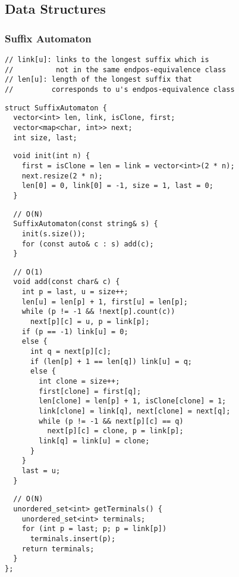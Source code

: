 \documentclass[twoside]{article}
\begin{document}
\begin{multicols*}{2}
\subsection*{Data Structures}
\vspace{2em}
\subsubsectionfont{\large\bfseries\sffamily\underline}
\subsubsection*{Suffix Automaton}
\begin{verbatim}
// link[u]: links to the longest suffix which is
//          not in the same endpos-equivalence class
// len[u]: length of the longest suffix that
//         corresponds to u's endpos-equivalence class
\end{verbatim}
\vspace{-12pt}
\begin{verbatim}
struct SuffixAutomaton {
  vector<int> len, link, isClone, first;
  vector<map<char, int>> next;
  int size, last;
\end{verbatim}
\vspace{-12pt}
\begin{verbatim}
  void init(int n) {
    first = isClone = len = link = vector<int>(2 * n);
    next.resize(2 * n);
    len[0] = 0, link[0] = -1, size = 1, last = 0;
  }
\end{verbatim}
\vspace{-12pt}
\begin{verbatim}
  // O(N)
  SuffixAutomaton(const string& s) {
    init(s.size());
    for (const auto& c : s) add(c);
  }
\end{verbatim}
\vspace{-12pt}
\begin{verbatim}
  // O(1)
  void add(const char& c) {
    int p = last, u = size++;
    len[u] = len[p] + 1, first[u] = len[p];
    while (p != -1 && !next[p].count(c))
      next[p][c] = u, p = link[p];
    if (p == -1) link[u] = 0;
    else {
      int q = next[p][c];
      if (len[p] + 1 == len[q]) link[u] = q;
      else {
        int clone = size++;
        first[clone] = first[q];
        len[clone] = len[p] + 1, isClone[clone] = 1;
        link[clone] = link[q], next[clone] = next[q];
        while (p != -1 && next[p][c] == q)
          next[p][c] = clone, p = link[p];
        link[q] = link[u] = clone;
      }
    }
    last = u;
  }
\end{verbatim}
\vspace{-12pt}
\begin{verbatim}
  // O(N)
  unordered_set<int> getTerminals() {
    unordered_set<int> terminals;
    for (int p = last; p; p = link[p])
      terminals.insert(p);
    return terminals;
  }
};
\end{verbatim}


\end{multicols*}
\end{document}

